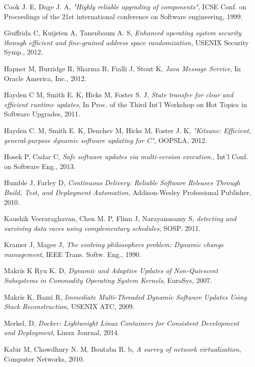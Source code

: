 \documentclass[a4paper,11pt,twoside]{report}
\begin{document}
\begin{thebibliography}{1}
 Cook J. E, Dage J. A, {\em "Highly reliable upgrading of components"}, ICSE Conf. on Proceedings of the 21st international conference on Software engineering, 1999.

Giuffrida C, Kuijsten A, Tanenbaum A. S, {\em Enhanced operating system security through efficient and fine-grained address space randomization}, USENIX Security Symp., 2012.

 Hapner M, Burridge R, Sharma R, Fialli J, Stout K, {\em Java Message Service}, In Oracle America, Inc., 2012.

 Hayden C M, Smith E. K, Hicks M, Foster S. J, {\em State transfer for clear and efficient runtime updates}, In Proc. of the Third Int'l Workshop on Hot Topics in Software Upgrades, 2011.

 Hayden C. M, Smith  E. K, Denchev M, Hicks M, Foster J. K, {\em "Kitsune: Efficient, general-purpose dynamic software updating for C"}, OOPSLA, 2012.

 Hosek P, Cadar C, {\em Safe software updates via multi-version execution.}, Int'l Conf. on Software Eng., 2013.

Humble J, Farley D, {\em Continuous Delivery: Reliable Software Releases Through Build, Test, and Deployment Automation}, Addison-Wesley Professional Publisher, 2010.     

 Kaushik Veeraraghavan, Chen M. P, Flinn J, Narayanasamy S, {\em detecting and surviving data races using complementary schedules}, SOSP, 2011. 

Kramer J, Magee J, {\em The evolving philosophers problem: Dynamic change management}, IEEE Trans. Softw. Eng., 1990. 

 Makris K Ryu K. D, {\em Dynamic and Adaptive Updates of Non-Quiescent Subsystems in Commodity Operating System Kernels}, EuroSys, 2007. 

Makris K, Bazzi R, {\em Immediate Multi-Threaded Dynamic Software Updates Using Stack Reconstruction}, USENIX ATC, 2009.

 Merkel, D, {\em Docker: Lightweight Linux Containers for Consistent Development and Deployment}, Linux Journal, 2014.

 Kabir M, Chowdhury N. M, Boutaba R. b, {\em A survey of network virtualization}, Computer Networks, 2010.


\end{thebibliography}
\end{document}
